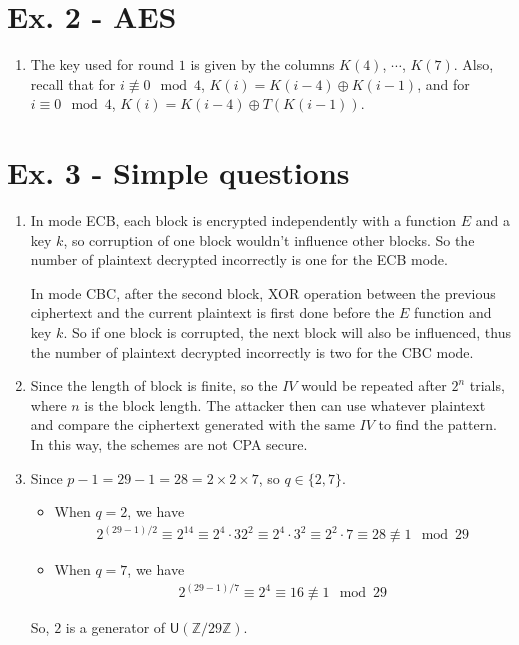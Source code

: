 \documentclass[11pt,a4paper]{article}
\begin{document}
\newpage
\section*{Ex. 2 - AES}
\begin{enumerate}
\item The key used for round $1$ is given by the columns $K(4)$, $\cdots$, $K(7)$. Also, recall that for $i \not\equiv 0 \mod 4$, $K(i) = K(i-4) \oplus K(i-1)$, and for $i \equiv 0 \mod 4$, $K(i) = K(i-4) \oplus T(K(i-1))$.
\end{enumerate}


\section*{Ex. 3 - Simple questions}
\begin{enumerate}
\item In mode ECB, each block is encrypted independently with a function $E$ and a key $k$, so corruption of one block wouldn't influence other blocks. So the number of plaintext decrypted incorrectly is one for the ECB mode.
\par In mode CBC, after the second block, XOR operation between the previous ciphertext and the current plaintext is first done before the $E$ function and key $k$. So if one block is corrupted, the next block will also be influenced, thus the number of plaintext decrypted incorrectly is two for the CBC mode.

\item Since the length of block is finite, so the $IV$ would be repeated after $2^{n}$ trials, where $n$ is the block length. The attacker then can use whatever plaintext and compare the ciphertext generated with the same $IV$ to find the pattern. In this way, the schemes are not CPA secure.

\item Since $p-1 = 29-1 = 28 = 2\times2\times7$, so $q\in\{2, 7\}$.
	\begin{itemize}
	\item When $q=2$, we have
	\begin{align*}
		2^{(29-1)/2} \equiv 2^{14} \equiv 2^{4}\cdot32^{2} \equiv 2^{4}\cdot3^{2} \equiv 2^{2}\cdot7 \equiv 28 \not\equiv 1 \mod 29
	\end{align*}
	
	\item When $q=7$, we have
	\begin{align*}
		2^{(29-1)/7} \equiv 2^{4} \equiv 16 \not\equiv 1 \mod 29
	\end{align*}
	\end{itemize}
\par So, $2$ is a generator of $\mathsf{U}(\mathbb{Z}/29\mathbb{Z})$.


\end{enumerate}
\end{document}
